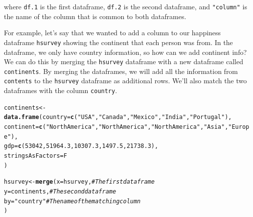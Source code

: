 \documentclass{tufte-book}\usepackage[]{graphicx}\usepackage[]{color}
\makeatletter
\newcommand{\hlnum}[1]{\textcolor[rgb]{0.686,0.059,0.569}{#1}}%
\newcommand{\hlstr}[1]{\textcolor[rgb]{0.192,0.494,0.8}{#1}}%
\newcommand{\hlcom}[1]{\textcolor[rgb]{0.678,0.584,0.686}{\textit{#1}}}%
\newcommand{\hlstd}[1]{\textcolor[rgb]{0.345,0.345,0.345}{#1}}%
\newcommand{\hlkwb}[1]{\textcolor[rgb]{0.69,0.353,0.396}{#1}}%
\newcommand{\hlkwc}[1]{\textcolor[rgb]{0.333,0.667,0.333}{#1}}%
\newcommand{\hlkwd}[1]{\textcolor[rgb]{0.737,0.353,0.396}{\textbf{#1}}}%
\newenvironment{kframe}{%
 \def\at@end@of@kframe{}%
 \ifinner\ifhmode%
  \def\at@end@of@kframe{\end{minipage}}%
  \begin{minipage}{\columnwidth}%
 \fi\fi%
 \def\FrameCommand##1{\hskip\@totalleftmargin \hskip-\fboxsep
 \colorbox{shadecolor}{##1}\hskip-\fboxsep
     \hskip-\linewidth \hskip-\@totalleftmargin \hskip\columnwidth}%
 \MakeFramed {\advance\hsize-\width
   \@totalleftmargin\z@ \linewidth\hsize
   \@setminipage}}%
 {\par\unskip\endMakeFramed%
 \at@end@of@kframe}
\newenvironment{knitrout}{}{} %
\makeatother
\begin{document}
\begin{footnotesize}
where \texttt{df.1} is the first dataframe, \texttt{df.2} is the second dataframe, and \texttt{"column"} is the name of the column that is common to both dataframes.

For example, let's say that we wanted to add a column to our happiness dataframe \texttt{hsurvey} showing the continent that each person was from. In the dataframe, we only have country information, so how can we add continent info? We can do this by merging the \texttt{hsurvey} dataframe with a new dataframe called \texttt{continents}. By merging the dataframes, we will add all the information from \texttt{contents} to the \texttt{hsurvey} dataframe as additional rows. We'll also match the two dataframes with the column \texttt{country}.

\begin{footnotesize}
\begin{knitrout}
\color{fgcolor}\begin{kframe}
\begin{alltt}
\hlstd{continents} \hlkwb{<-} \hlkwd{data.frame}\hlstd{(}\hlkwc{country} \hlstd{=} \hlkwd{c}\hlstd{(}\hlstr{"USA"}\hlstd{,} \hlstr{"Canada"}\hlstd{,} \hlstr{"Mexico"}\hlstd{,} \hlstr{"India"}\hlstd{,} \hlstr{"Portugal"}\hlstd{),}
                         \hlkwc{continent} \hlstd{=} \hlkwd{c}\hlstd{(}\hlstr{"North America"}\hlstd{,} \hlstr{"North America"}\hlstd{,} \hlstr{"North America"}\hlstd{,} \hlstr{"Asia"}\hlstd{,} \hlstr{"Europe"}\hlstd{),}
                         \hlkwc{gdp} \hlstd{=} \hlkwd{c}\hlstd{(}\hlnum{53042}\hlstd{,} \hlnum{51964.3}\hlstd{,} \hlnum{10307.3}\hlstd{,} \hlnum{1497.5}\hlstd{,} \hlnum{21738.3}\hlstd{),}
                         \hlkwc{stringsAsFactors} \hlstd{= F}
                         \hlstd{)}

\hlstd{hsurvey} \hlkwb{<-} \hlkwd{merge}\hlstd{(}\hlkwc{x} \hlstd{= hsurvey,} \hlcom{# The first dataframe}
                 \hlkwc{y} \hlstd{= continents,} \hlcom{# The second dataframe}
                 \hlkwc{by} \hlstd{=} \hlstr{"country"} \hlcom{# The name of the matching column}
                 \hlstd{)}
\end{alltt}


{\ttfamily\noindent\bfseries{}}\end{kframe}
\end{knitrout}
\end{footnotesize}


\end{footnotesize}
\end{document}
